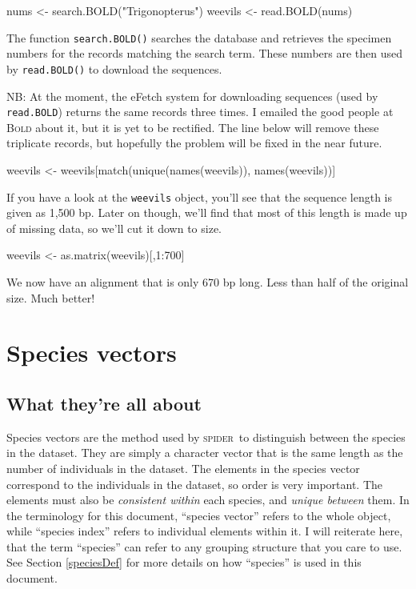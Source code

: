 \documentclass{article}
\newcommand{\spider}{\textsc{spider}} %
\newcommand{\progname}[1]{\textsc{#1}}
\newcommand{\fun}[1]{\texttt{#1}}
\begin{document}
\begin{console}
nums <- search.BOLD("Trigonopterus")
weevils <- read.BOLD(nums)
\end{console}

The function \fun{search.BOLD()} searches the database and retrieves the specimen numbers for the records matching the search term. These numbers are then used by \fun{read.BOLD()} to download the sequences.

NB: At the moment, the eFetch system for downloading sequences (used by \fun{read.BOLD}) returns the same records three times. I emailed the good people at \progname{Bold} about it, but it is yet to be rectified. The line below will remove these triplicate records, but hopefully the problem will be fixed in the near future.

\begin{console}
weevils <- weevils[match(unique(names(weevils)), names(weevils))]
\end{console}

If you have a look at the \fun{weevils} object, you'll see that the sequence length is given as 1,500 bp. Later on though, we'll find that most of this length is made up of missing data, so we'll cut it down to size.

\begin{console}
weevils <- as.matrix(weevils)[,1:700]
\end{console}

We now have an alignment that is only 670 bp long. Less than half of the original size. Much better!



\section{Species vectors}
\label{species.vectors}

\subsection{What they're all about}
Species vectors are the method used by \spider~to distinguish between the species in the dataset. They are simply a character vector that is the same length as the number of individuals in the dataset. The elements in the species vector correspond to the individuals in the dataset, so order is very important. The elements must also be \emph{consistent within} each species, and \emph{unique between} them. In the terminology for this document, ``species vector'' refers to the whole object, while ``species index'' refers to individual elements within it. I will reiterate here, that the term ``species'' can refer to any grouping structure that you care to use. See Section \ref{speciesDef} for more details on how ``species'' is used in this document.
\end{document}
